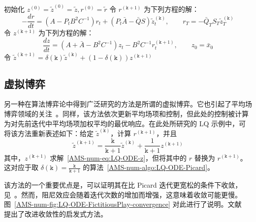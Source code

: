 \documentclass{amsproc}
\theoremstyle{definition}
\theoremstyle{remark}
\numberwithin{equation}{section}
\begin{document}
\begin{algorithm}[H]
\DontPrintSemicolon
  
  初始化 $z^{(0)} = \tilde z^{(0)} = \tilde z, r^{(0)} = \tilde r$ \;
        { 
        	令 $r^{(\mathtt{k}+1)}$ 为下列方程的解：
	$$
		 - \frac{d r}{dt} = (A - P_t B^2 C^{-1})r_t + (P_t \bar{A} - \bar{Q} S) \tilde{z}^{(\mathtt{k})}_t, 	\qquad r_T = - \bar{Q}_T S_T \tilde{z}^{(\mathtt{k})}_T
	$$\;
	令 $z^{(\mathtt{k}+1)}$ 为下列方程的解：
	$$
		\frac{d z}{dt} = (A+\bar{A} - B^2 C^{-1}) z_t - B^2 C^{-1} r^{(\mathtt{k}+1)}_t, 			\qquad  z_0 = \bar x_0 
	$$\;
	令 $\tilde{z}^{(\mathtt{k}+1)} = \delta(\mathtt{k}) \tilde{z}^{(\mathtt{k})} + (1-\delta(\mathtt{k})) z^{(\mathtt{k}+1)}$
        }

\caption{固定点迭代 \label{AMS-num-algo:LQ-ODE-Picard}}
\end{algorithm}














\subsection{虚拟博弈}

另一种在算法博弈论中得到广泛研究的方法是所谓的虚拟博弈。它也引起了平均场博弈领域的关注~\cite{MR3608094,MR4030259,Elie2020OnTC,perrin2020fictitious}。同样，该方法依次更新平均场项和控制，但此处的控制被计算为对先前迭代中平均场项加权平均的最优响应。在此处所研究的 LQ 示例中，可将该方法重新表述如下：给定 $\tilde{z}^{(\mathtt{k})}$，计算 $r^{(\mathtt{k}+1)}$，并且 
$$
	\tilde{z}^{(\mathtt{k}+1)} = \frac{\mathtt{k}}{\mathtt{k}+1} \tilde{z}^{(\mathtt{k})} + \frac{1}{\mathtt{k}+1} z^{(\mathtt{k}+1)}
$$
其中，$z^{(\mathtt{k}+1)}$ 求解~\eqref{AMS-num-eq:LQ-ODE-z}，但将其中的 $r$ 替换为 $r^{(\mathtt{k}+1)}$。 
 这对应于取 $\delta(\mathtt{k}) = \frac{\mathtt{k}}{\mathtt{k}+1}$ 的算法~\ref{AMS-num-algo:LQ-ODE-Picard}。 
 
该方法的一个重要优点是，可以证明其在比 Picard 迭代更宽松的条件下收敛，见~\cite{MR3608094}。然而，阻尼效应会随着迭代次数的增加而增强，这意味着收敛可能更慢。图~\ref{AMS-num-fig:LQ-ODE-FictitiousPlay-convergence} 对此进行了说明。文献~\cite{MR4030259} 提出了改进收敛性的启发式方法。
\end{document}
